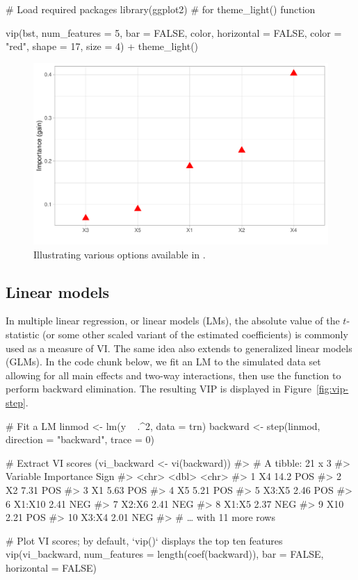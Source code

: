 \begin{example}
# Load required packages
library(ggplot2)  # for theme_light() function

vip(bst, num_features = 5, bar = FALSE, color, horizontal = FALSE, 
    color = "red", shape = 17, size = 4) +
  theme_light()
\end{example}

\begin{figure}[!htb]
  \centering 
  \includegraphics[width=1\linewidth]{figures/dot-plot} 
  \caption{Illustrating various options available in .}
  \label{fig:dot-plot}
\end{figure}


\subsection{Linear models}

In multiple linear regression, or linear models (LMs), the absolute value of the $t$-statistic (or some other scaled variant of the estimated coefficients) is commonly used as a measure of VI. The same idea also extends to generalized linear models (GLMs). In the code chunk below, we fit an LM to the simulated  data set allowing for all main effects and two-way interactions, then use the  function to perform backward elimination. The resulting VIP is displayed in Figure~\ref{fig:vip-step}.

\begin{example}
# Fit a LM
linmod <- lm(y ~ .^2, data = trn)
backward <- step(linmod, direction = "backward", trace = 0)

# Extract VI scores
(vi_backward <- vi(backward))
#> # A tibble: 21 x 3
#>    Variable Importance Sign 
#>    <chr>         <dbl> <chr>
#>  1 X4            14.2  POS  
#>  2 X2             7.31 POS  
#>  3 X1             5.63 POS  
#>  4 X5             5.21 POS  
#>  5 X3:X5          2.46 POS  
#>  6 X1:X10         2.41 NEG  
#>  7 X2:X6          2.41 NEG  
#>  8 X1:X5          2.37 NEG  
#>  9 X10            2.21 POS  
#> 10 X3:X4          2.01 NEG  
#> # … with 11 more rows

# Plot VI scores; by default, `vip()` displays the top ten features
vip(vi_backward, num_features = length(coef(backward)), 
    bar = FALSE, horizontal = FALSE)
\end{example}

